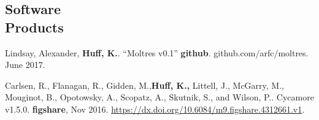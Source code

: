 \documentclass[margin,line]{resume}
\begin{document}
\begin{resume}
    \section{\mysidestyle Software\\Products}
    \begin{bibenum}
    \item Lindsay, Alexander, \textbf{Huff, K.}. ``Moltres v0.1'' 
            \textbf{github}. github.com/arfc/moltres. June 2017. 
    \item Carlsen, R., Flanagan, R., Gidden, M.,\textbf{Huff, K.,} Littell, J., 
            McGarry, M., Mouginot, B., Opotowsky, A., Scopatz, A., Skutnik, S., 
            and Wilson, P.. Cycamore v1.5.0. \textbf{figshare}, Nov 2016. 
            \url{https://dx.doi.org/10.6084/m9.figshare.4312661.v1}.
    \end{bibenum}

\end{resume}
\end{document}
